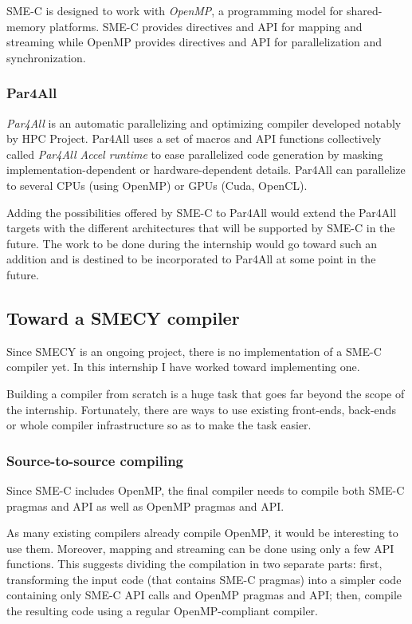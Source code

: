 \documentclass[a4paper]{article}
\begin{document}
	SME-C is designed to work with \emph{OpenMP}, a programming model for shared-memory platforms. SME-C provides directives and API for mapping and streaming while OpenMP provides directives and API for parallelization and synchronization.
	
	\subsubsection{Par4All}
	\emph{Par4All} is an automatic parallelizing and optimizing compiler
    developed notably by HPC Project. Par4All uses a set of macros and API
    functions collectively called \emph{Par4All Accel runtime} to ease
    parallelized code generation by masking implementation-dependent or
    hardware-dependent details. Par4All can parallelize to several CPUs
    (using OpenMP) or GPUs (Cuda, OpenCL).

	Adding the possibilities offered by SME-C to Par4All would extend the Par4All targets with the different architectures that will be supported by SME-C in the future. The work to be done during the internship would go toward such an addition and is destined to be incorporated to Par4All at some point in the future.
	
	\subsection{Toward a SMECY compiler}
	Since SMECY is an ongoing project, there is no implementation of a SME-C compiler yet. In this internship I have worked toward implementing one.
	
	Building a compiler from scratch is a huge task that goes far beyond the scope of the internship. Fortunately, there are ways to use existing front-ends, back-ends or whole compiler infrastructure so as to make the task easier.

	\subsubsection{Source-to-source compiling}
	Since SME-C includes OpenMP, the final compiler needs to compile both SME-C pragmas and API as well as OpenMP pragmas and API.
	
	As many existing compilers already compile OpenMP, it would be interesting to use them. Moreover, mapping and streaming can be done using only a few API functions. This suggests dividing the compilation in two separate parts: first, transforming the input code (that contains SME-C pragmas) into a simpler code containing only SME-C API calls and OpenMP pragmas and API; then, compile the resulting code using a regular OpenMP-compliant compiler.
	
\end{document}
